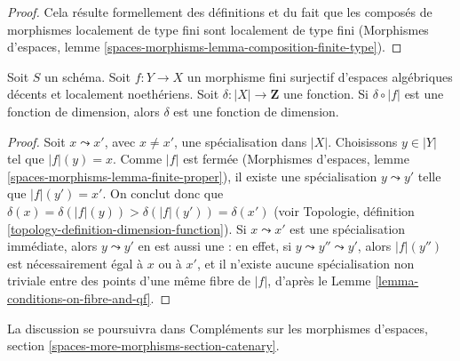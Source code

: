 \begin{proof}
Cela résulte formellement des définitions et du fait que les composés de
morphismes localement de type fini sont localement de type fini
(Morphismes d'espaces, lemme
\ref{spaces-morphisms-lemma-composition-finite-type}).
\end{proof}

\begin{lemma}
\label{lemma-check-dimension-function-finite-cover}
Soit $S$ un schéma. Soit $f : Y \to X$ un morphisme fini surjectif d'espaces
algébriques décents et localement noethériens. Soit
$\delta : |X| \to \mathbf{Z}$ une fonction. Si $\delta \circ |f|$ est une
fonction de dimension, alors $\delta$ est une fonction de dimension.
\end{lemma}

\begin{proof}
Soit $x \leadsto x'$, avec $x \not = x'$, une spécialisation dans $|X|$.
Choisissons $y \in |Y|$ tel que $|f|(y) = x$. Comme $|f|$ est fermée
(Morphismes d'espaces, lemme \ref{spaces-morphisms-lemma-finite-proper}),
il existe une spécialisation $y \leadsto y'$ telle que $|f|(y') = x'$.
On conclut donc que
$\delta(x) = \delta(|f|(y)) > \delta(|f|(y')) = \delta(x')$
(voir Topologie, définition \ref{topology-definition-dimension-function}).
Si $x \leadsto x'$ est une spécialisation immédiate, alors
$y \leadsto y'$ en est aussi une : en effet, si
$y \leadsto y'' \leadsto y'$, alors $|f|(y'')$ est nécessairement égal à
$x$ ou à $x'$, et il n'existe aucune spécialisation non triviale entre des
points d'une même fibre de $|f|$, d'après le
Lemme \ref{lemma-conditions-on-fibre-and-qf}.
\end{proof}

\noindent
La discussion se poursuivra dans Compléments sur les morphismes d'espaces,
section \ref{spaces-more-morphisms-section-catenary}.
















